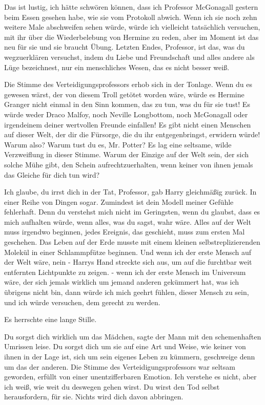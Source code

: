 \glqq{}Das ist lustig, ich hätte schwören können, dass ich Professor McGonagall
gestern beim Essen gesehen habe, wie sie vom Protokoll abwich. Wenn ich sie noch
zehn weitere Male abschweifen sehen würde, würde ich vielleicht tatsächlich
versuchen, mit ihr über die Wiederbelebung von Hermine zu reden, aber im Moment
ist das neu für sie und sie braucht Übung. Letzten Endes, Professor, ist das,
was du wegzuerklären versuchst, indem du Liebe und Freundschaft und alles andere
als Lüge bezeichnest, nur ein menschliches Wesen, das es nicht besser
weiß.\grqq{}

Die Stimme des Verteidigungsprofessors erhob sich in der Tonlage. \glqq{}Wenn du
es gewesen wärst, der von diesem Troll getötet worden wäre, würde es Hermine
Granger nicht einmal in den Sinn kommen, das zu tun, was du für sie tust! Es
würde weder Draco Malfoy, noch Neville Longbottom, noch McGonagall oder
irgendeinem deiner wertvollen Freunde einfallen! Es gibt nicht einen Menschen
auf dieser Welt, der dir die Fürsorge, die du ihr entgegenbringst, erwidern
würde! Warum also? Warum tust du es, Mr. Potter?\grqq{} Es lag eine seltsame,
wilde Verzweiflung in dieser Stimme. \glqq{}Warum der Einzige auf der Welt sein,
der sich solche Mühe gibt, den Schein aufrechtzuerhalten, wenn keiner von ihnen
jemals das Gleiche für dich tun wird?\grqq{}

\glqq{}Ich glaube, du irrst dich in der Tat, Professor\grqq{}, gab Harry
gleichmäßig zurück. \glqq{}In einer Reihe von Dingen sogar. Zumindest ist dein
Modell meiner Gefühle fehlerhaft. Denn du verstehst mich nicht im Geringsten,
wenn du glaubst, dass es mich aufhalten würde, wenn alles, was du sagst, wahr
wäre. Alles auf der Welt muss irgendwo beginnen, jedes Ereignis, das geschieht,
muss zum ersten Mal geschehen. Das Leben auf der Erde musste mit einem kleinen
selbstreplizierenden Molekül in einer Schlammpfütze beginnen. Und wenn ich der
erste Mensch auf der Welt wäre, nein -\grqq{} Harrys Hand streckte sich aus, um
auf die furchtbar weit entfernten Lichtpunkte zu zeigen. \glqq{}- wenn ich der
erste Mensch im Universum wäre, der sich jemals wirklich um jemand anderen
gekümmert hat, was ich übrigens nicht bin, dann würde ich mich geehrt fühlen,
dieser Mensch zu sein, und ich würde versuchen, dem gerecht zu werden.\grqq{}

Es herrschte eine lange Stille.

\glqq{}Du sorgst dich wirklich um das Mädchen\grqq{}, sagte der Mann mit den
schemenhaften Umrissen leise. \glqq{}Du sorgst dich um sie auf eine Art und
Weise, wie keiner von ihnen in der Lage ist, sich um sein eigenes Leben zu
kümmern, geschweige denn um das der anderen.\grqq{} Die Stimme des
Verteidigungsprofessors war seltsam geworden, erfüllt von einer unentzifferbaren
Emotion. \glqq{}Ich verstehe es nicht, aber ich weiß, wie weit du deswegen gehen
wirst. Du wirst den Tod selbst herausfordern, für sie. Nichts wird dich davon
abbringen.\grqq{}

